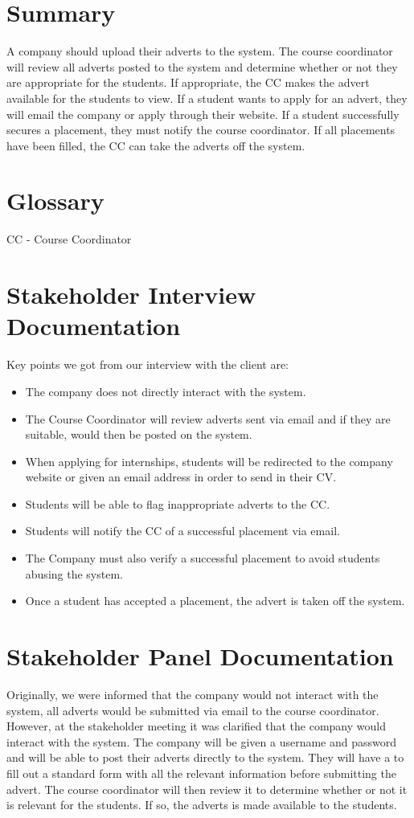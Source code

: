 \documentclass{l3deliverable}
\begin{document}
\section{Summary}
A company should upload their adverts to the system. The course coordinator will review
all adverts posted to the system and determine whether or not they are appropriate for the
students. If appropriate, the CC makes the advert available for the students to view. If a student
wants to apply for an advert, they will email the company or apply through their website. If
a student successfully secures a placement, they must notify the course coordinator. If all
placements have been filled, the CC can take the adverts off the system.
\appendix
\section{Glossary}
CC - Course Coordinator
\section{Stakeholder Interview Documentation}
Key points we got from our interview with the client are:
\begin{itemize}
\item The company does not directly interact with the system.
\item The Course Coordinator will review adverts sent via email and if they are suitable, would
then be posted on the system.
\item When applying for internships, students will be redirected to the company website or given
an email address in order to send in their CV.
\item Students will be able to flag inappropriate adverts to the CC.
\item Students will notify the CC of a successful placement via email.
\item The Company must also verify a successful placement to avoid students abusing the
system.
\item Once a student has accepted a placement, the advert is taken off the system.
\end{itemize}
\section{Stakeholder Panel Documentation}
Originally, we were informed that the company would not interact with the system, all adverts
would be submitted via email to the course coordinator. However, at the stakeholder meeting
it was clarified that the company would interact with the system. The company will be given a
username and password and will be able to post their adverts directly to the system. They will
have a to fill out a standard form with all the relevant information before submitting the advert.
The course coordinator will then review it to determine whether or not it is relevant for the
students. If so, the adverts is made available to the students.
\end{document}
